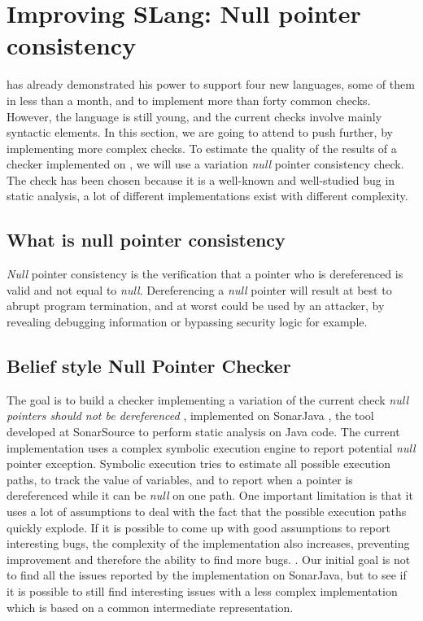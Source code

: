 \section{Improving SLang: Null pointer consistency}
\label{sec:improving_slang}

\slang{} has already demonstrated his power to support four new languages, some of them in less than a month, and to implement more than forty common checks. 
However, the language is still young, and the current checks involve mainly syntactic elements. 
In this section, we are going to attend to push \slang{} further, by implementing more complex checks.
To estimate the quality of the results of a checker implemented on \slang{}, we will use a variation \emph{null} pointer consistency check. 
The check has been chosen because it is a well-known and well-studied bug in static analysis, a lot of different implementations exist with different complexity.

\subsection{What is null pointer consistency}
\label{subsec:null_pointer_consistency}

\emph{Null} pointer consistency is the verification that a pointer who is dereferenced is valid and not equal to \emph{null}. Dereferencing a \emph{null} pointer will result at best to abrupt program termination, and at worst could be used by an attacker, by revealing debugging information or bypassing security logic for example.

\subsection{Belief style Null Pointer Checker}
\label{subsec:belief_style}

The goal is to build a checker implementing a variation of the current check \emph{null pointers should not be dereferenced} \cite{RSPEC-2259:2019:Online}, implemented on SonarJava \cite{SonarJava:2019:Online}, the tool developed at SonarSource to perform static analysis on Java code.
The current implementation uses a complex symbolic execution engine to report potential \emph{null} pointer exception.
Symbolic execution tries to estimate all possible execution paths, to track the value of variables, and to report when a pointer is dereferenced while it can be \emph{null} on one path.
One important limitation is that it uses a lot of assumptions to deal with the fact that the possible execution paths quickly explode. 
If it is possible to come up with good assumptions to report interesting bugs, the complexity of the implementation also increases, preventing improvement and therefore the ability to find more bugs. \cite{Brown:2016:BSC:2954679.2872364}. 
Our initial goal is not to find all the issues reported by the implementation on SonarJava, but to see if it is possible to still find interesting issues with a less complex implementation which is based on a common intermediate representation.

